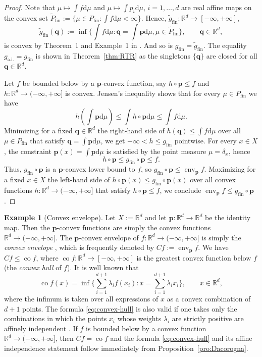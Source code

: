 \documentclass[a4paper,11pt,reqno]{amsart}
\numberwithin{equation}{section}
\theoremstyle{plain}
\theoremstyle{definition}
\newtheorem{example}[theorem]{Example}
\newcommand{\bp}{\mathbf{p}}
\newcommand{\bq}{\mathbf{q}}
\newcommand{\dd}{\mathrm{d}} %
\newcommand{\R}{\mathbb{R}} %
\DeclareMathOperator\conv{co} %
\DeclareMathOperator\env{env} %
\newcommand\ait{\mathrm{a.i.}}
\newcommand\fint{\mathrm{fin}}
\begin{document}
%
\begin{proof}
Note that $\mu\mapsto\int f\dd\mu$ and $\mu\mapsto\int p_i\dd\mu$, $i=1,\dots,d$ 
are real affine maps on the convex set 
$\tilde P\!_\fint:=\{\mu\in P\!_\fint:\int f\dd\mu<\infty\}$. Hence, 
$\tilde g_\fint\colon \R^d\to[-\infty,+\infty]$,
\[\textstyle
\tilde g_\fint(\bq):=
\inf\{\int f\dd\mu : \bq=\int\bp\dd\mu, \mu\in\tilde P\!_\fint\},
\qquad \bq\in\R^d,
\]
is convex by Theorem~1 and Example~1 in \cite{rockafellar74}. And so is 
$g_\fint=\tilde g_\fint$. The equality $g_\ait=g_\fint$ is shown in
Theorem~\ref{thm:RTR} as the singletons $\{\bq\}$ are closed for all
$\bq\in\R^d$.
\par
%
Let $f$ be bounded below by a $\bp$-convex function, say $h\circ\bp\leq f$ and
$h\colon\R^d\to(-\infty,+\infty]$ is convex. Jensen's inequality 
\cite[Theorem~4.3]{rockafellar70} shows that for every $\mu\in P\!_\fint$ we have
\[\textstyle
h(\int\bp\dd\mu)
\leq \int h\circ\bp\dd\mu
\leq \int f\dd\mu.
\]
Minimizing for a fixed $\bq\in\R^d$ the right-hand side of $h(\bq)\leq\int f\dd\mu$
over all $\mu\in P\!_\fint$ that satisfy $\bq=\int\bp\dd\mu$, we get 
$-\infty<h\leq g_\fint$ pointwise. For every $x\in X$, the constraint 
$\bp(x)=\int\bp\dd\mu$ is satisfied by the point measure $\mu=\delta_x$, hence
\[\textstyle
h\circ\bp
\leq g_\fint\circ\bp
\leq f.
\]
Thus, $g_\fint\circ\bp$ is a $\bp$-convex lower bound to $f$, so 
$g_\fint\circ\bp\leq \env_\bp f$. Maximizing for a fixed $x\in X$ the left-hand 
side of $h\circ\bp(x)\leq g_\fint\circ\bp(x)$ over all convex functions 
$h\colon\R^d\to(-\infty,+\infty]$ that satisfy $h\circ\bp\leq f$, we conclude 
$\env_\bp f\leq g_\fint\circ\bp$.
\end{proof}
%
\begin{example}[Convex envelope]\label{exa:convex-env}
Let $X:=\R^d$ and let $\bp\colon\R^d\to\R^d$ be the identity map. Then the $\bp$-convex 
functions are simply the convex functions $\R^d\to(-\infty,+\infty]$. The $\bp$-convex 
envelope of $f\colon\R^d\to(-\infty,+\infty]$ is simply the \emph{convex envelope} 
\cite{dacorogna08}, which is frequently denoted by $Cf:=\env_\bp f$. We have 
$C f\leq\conv f$, where $\conv f\colon\R^d\to[-\infty,+\infty]$ is the greatest convex 
function below $f$ (the \emph{convex hull} of $f$). It is well known that
\begin{equation}\label{eq:convex-hull}\textstyle
\conv f(x)=\inf\{\sum_{i=1}^{d+1}\lambda_if(x_i) : x=\sum_{i=1}^{d+1}\lambda_ix_i\},
\qquad x\in\R^d,
\end{equation}
where the infimum is taken over all expressions of $x$ as a convex combination of $d+1$ points. 
The formula \eqref{eq:convex-hull} is also valid if one takes only the combinations in which 
the points $x_i$ whose weights $\lambda_i$ are strictly positive are affinely independent 
\cite[Corollary~17.1.5]{rockafellar70}. If $f$ is bounded below by a convex function 
$\R^d\to(-\infty,+\infty]$, then $C f=\conv f$ and the formula \eqref{eq:convex-hull} and its 
affine independence statement follow immediately from Proposition~\ref{pro:Dacorogna}.
\end{example}
\end{document}
